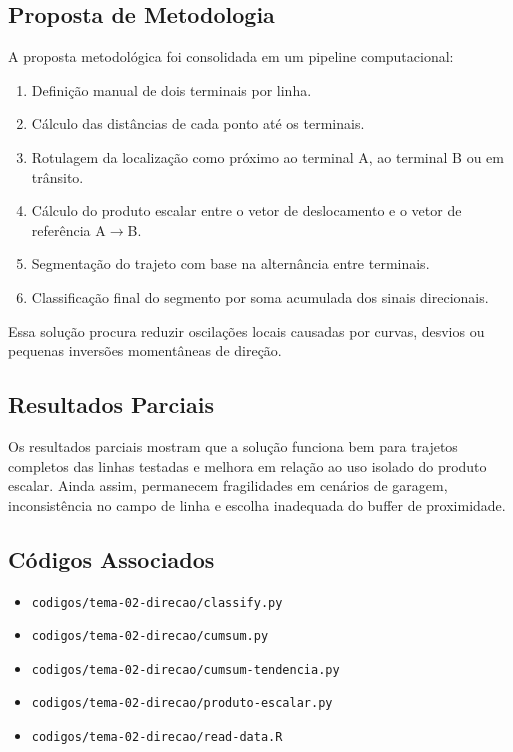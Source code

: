 \documentclass[runningheads]{llncs}
\begin{document}
\subsection{Proposta de Metodologia}
A proposta metodológica foi consolidada em um pipeline computacional:
\begin{enumerate}[leftmargin=*]
\item Definição manual de dois terminais por linha.
\item Cálculo das distâncias de cada ponto até os terminais.
\item Rotulagem da localização como próximo ao terminal A, ao terminal B ou em trânsito.
\item Cálculo do produto escalar entre o vetor de deslocamento e o vetor de referência A$\rightarrow$B.
\item Segmentação do trajeto com base na alternância entre terminais.
\item Classificação final do segmento por soma acumulada dos sinais direcionais.
\end{enumerate}

Essa solução procura reduzir oscilações locais causadas por curvas, desvios ou pequenas inversões momentâneas de direção.

\subsection{Resultados Parciais}
Os resultados parciais mostram que a solução funciona bem para trajetos completos das linhas testadas e melhora em relação ao uso isolado do produto escalar. Ainda assim, permanecem fragilidades em cenários de garagem, inconsistência no campo de linha e escolha inadequada do buffer de proximidade.

\subsection{Códigos Associados}
\begin{itemize}[leftmargin=*]
\item \texttt{codigos/tema-02-direcao/classify.py}
\item \texttt{codigos/tema-02-direcao/cumsum.py}
\item \texttt{codigos/tema-02-direcao/cumsum-tendencia.py}
\item \texttt{codigos/tema-02-direcao/produto-escalar.py}
\item \texttt{codigos/tema-02-direcao/read-data.R}
\end{itemize}
\end{document}
